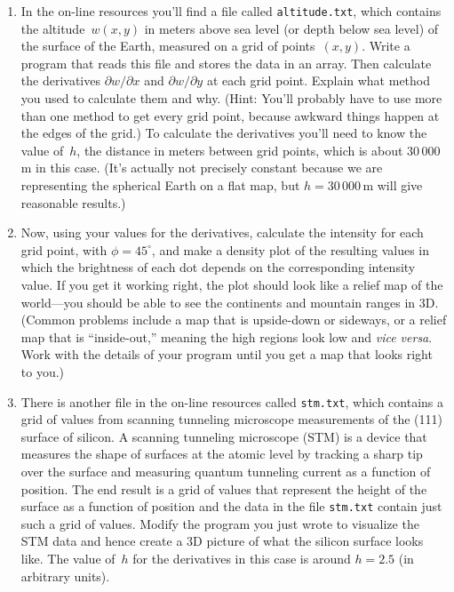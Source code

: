 \documentclass[12pt]{article}
\begin{document}
\begin{exercises}
\begin{enumerate}\setlength{\itemsep}{0pt}
\item In the on-line resources you'll find a file called
  \verb|altitude.txt|, which contains the altitude~$w(x,y)$ in meters above
  sea level (or depth below sea level) of the surface of the Earth,
  measured on a grid of points~$(x,y)$.  Write a program that reads this
  file and stores the data in an array.  Then calculate the derivatives
  $\partial w/\partial x$ and $\partial w/\partial y$ at each grid point.
  Explain what method you used to calculate them and why.  (Hint: You'll
  probably have to use more than one method to get every grid point,
  because awkward things happen at the edges of the grid.)  To calculate
  the derivatives you'll need to know the value of~$h$, the distance in
  meters between grid points, which is about $30\,000\,$m in this case.
  (It's actually not precisely constant because we are representing the
  spherical Earth on a flat map, but $h=30\,000\,$m will give reasonable
  results.)
\item Now, using your values for the derivatives, calculate the intensity
  for each grid point, with $\phi=45^\circ$, and make a density plot of the
  resulting values in which the brightness of each dot depends on the
  corresponding intensity value.  If you get it working right, the plot
  should look like a relief map of the world---you should be able to see
  the continents and mountain ranges in 3D.  (Common problems include a map
  that is upside-down or sideways, or a relief map that is ``inside-out,''
  meaning the high regions look low and \textit{vice versa}.  Work with the
  details of your program until you get a map that looks right to you.)
\item There is another file in the on-line resources called \verb|stm.txt|,
  which contains a grid of values from scanning tunneling microscope
  measurements of the (111) surface of silicon.  A scanning
  tunneling microscope (STM) is a device that measures the shape of
  surfaces at the atomic level by tracking a sharp tip over the surface and
  measuring quantum tunneling current as a function of position.  The end
  result is a grid of values that represent the height of the surface as a
  function of position and the data in the file \verb|stm.txt| contain just
  such a grid of values.  Modify the program you just wrote to visualize
  the STM data and hence create a 3D picture of what the silicon
  surface looks like.  The value of~$h$ for the derivatives in this case is
  around $h=2.5$ (in arbitrary units).
\end{enumerate}

\end{exercises}
\end{document}
